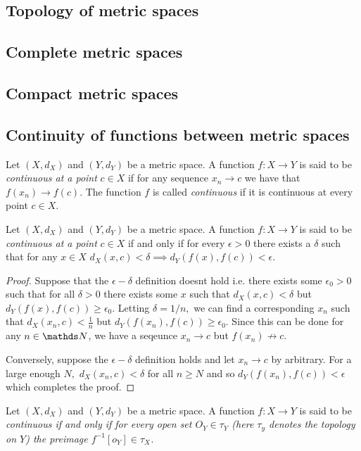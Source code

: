 \subsection{Topology of metric spaces}

\subsection{Complete metric spaces}

\subsection{Compact metric spaces}

\subsection{Continuity of functions between metric spaces}
\begin{defn}
\label{def:continousFunction}Let $\left(X,d_{X}\right)$ and $\left(Y,d_{Y}\right)$
be a metric space. A function $f:X\to Y$ is said to be \emph{continuous
at a point} $c\in X$ if for any sequence $x_{n}\to c$ we have that
$f\left(x_{n}\right)\to f\left(c\right)$. The function $f$ is called
\emph{continuous }if it is continuous at every point $c\in X$.
\end{defn}

\begin{prop}
\label{prop:equivalentContinuity}Let $\left(X,d_{X}\right)$ and
$\left(Y,d_{Y}\right)$ be a metric space. A function $f:X\to Y$
is said to be \emph{continuous at a point} $c\in X$ if and only if
for every $\epsilon>0$ there exists a $\delta$ such that for any
$x\in X$ $d_{X}\left(x,c\right)<\delta\implies d_{Y}\left(f\left(x\right),f\left(c\right)\right)<\epsilon$.
\end{prop}

\begin{proof}
Suppose that the $\epsilon-\delta$ definition doesnt hold i.e. there
exists some $\epsilon_{0}>0$ such that for all $\delta>0$ there
exists some $x$ such that $d_{X}\left(x,c\right)<\delta$ but $d_{Y}\left(f\left(x\right),f\left(c\right)\right)\geq\epsilon_{0}.$
Letting $\delta=1/n,$ we can find a corresponding $x_{n}$ such that
$d_{X}\left(x_{n},c\right)<\frac{1}{n}$ but $d_{Y}\left(f\left(x_{n}\right),f\left(c\right)\right)\geq\epsilon_{0}$.
Since this can be done for any $n\in\N$, we have a seqeunce $x_{n}\to c$
but $f\left(x_{n}\right)\not\to c$.

Conversely, suppose the $\epsilon-\delta$ definition holds and let
$x_{n}\to c$ by arbitrary. For a large enough $N,$ $d_{X}\left(x_{n},c\right)<\delta$
for all $n\geq N$ and so $d_{Y}\left(f\left(x_{n}\right),f\left(c\right)\right)<\epsilon$
which completes the proof.
\end{proof}
\begin{prop}
\label{prop:openPreImageMetric}Let $\left(X,d_{X}\right)$ and $\left(Y,d_{Y}\right)$
be a metric space. A function $f:X\to Y$ is said to be \emph{continuous
if and only if for every open set $O_{Y}\in\tau_{Y}$ (here $\tau_{y}$
denotes the topology on $Y$) the preimage $f^{-1}\left[o_{Y}\right]\in\tau_{X}$.}
\end{prop}

